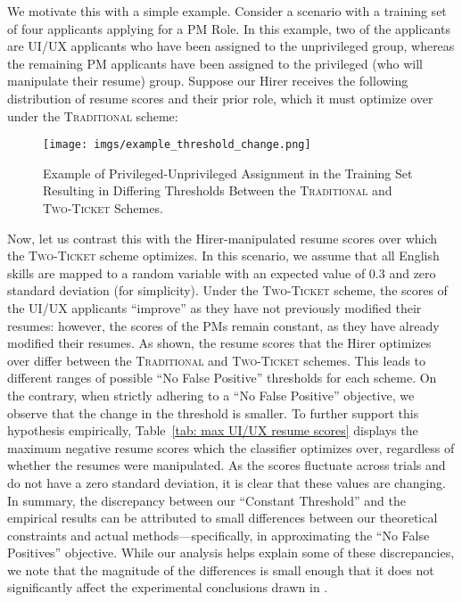 We motivate this with a simple example. Consider a scenario with a training set of four applicants applying for a PM Role. In this example, two of the applicants are UI/UX applicants who have been assigned to the unprivileged group, whereas the remaining PM applicants have been assigned to the privileged (who will manipulate their resume) group.  
Suppose our Hirer receives the following distribution of resume scores and their prior role, which it must optimize over under the \textsc{Traditional} scheme:
\begin{figure}[H]
    \centering
    \texttt{[image: imgs/example\_threshold\_change.png]}
    \caption{Example of Privileged-Unprivileged Assignment in the Training Set Resulting in Differing Thresholds Between the \textsc{Traditional} and \textsc{Two-Ticket} Schemes.}
    \label{fig:enter-label}
\end{figure}
Now, let us contrast this with the Hirer-manipulated resume scores over which the \textsc{Two-Ticket} scheme optimizes. In this scenario, we assume that all English skills are mapped to a random variable with an expected value of 0.3 and zero standard deviation (for simplicity). Under the \textsc{Two-Ticket} scheme, the scores of the UI/UX applicants “improve” as they have not previously modified their resumes: however, the scores of the PMs remain constant, as they have already modified their resumes.
As shown, the resume scores that the Hirer optimizes over differ between the \textsc{Traditional} and \textsc{Two-Ticket} schemes. This leads to different ranges of possible “No False Positive” thresholds for each scheme. On the contrary, when strictly adhering to a “No False Positive” objective, we observe that the change in the threshold is smaller. 
To further support this hypothesis empirically, Table~\ref{tab: max UI/UX resume scores} displays the maximum negative resume scores which the classifier optimizes over, regardless of whether the resumes were manipulated. As the scores fluctuate across trials and do not have a zero standard deviation, it is clear that these values are changing. In summary, the discrepancy between our “Constant Threshold” and the empirical results can be attributed to small differences between our theoretical constraints and actual methods—specifically, in approximating the “No False Positives” objective. While our analysis helps explain some of these discrepancies, we note that the magnitude of the differences is small enough that it does not significantly affect the experimental conclusions drawn in .

